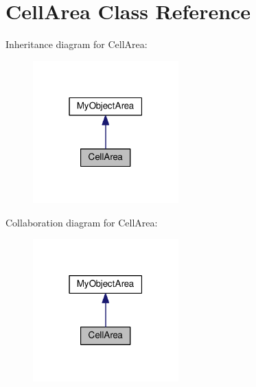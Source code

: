 \hypertarget{class_cell_area}{}\section{Cell\+Area Class Reference}
\label{class_cell_area}


Inheritance diagram for Cell\+Area\+:
\nopagebreak
\begin{figure}[H]
\begin{center}
\leavevmode
\includegraphics[width=159pt]{class_cell_area__inherit__graph}
\end{center}
\end{figure}


Collaboration diagram for Cell\+Area\+:
\nopagebreak
\begin{figure}[H]
\begin{center}
\leavevmode
\includegraphics[width=159pt]{class_cell_area__coll__graph}
\end{center}
\end{figure}
